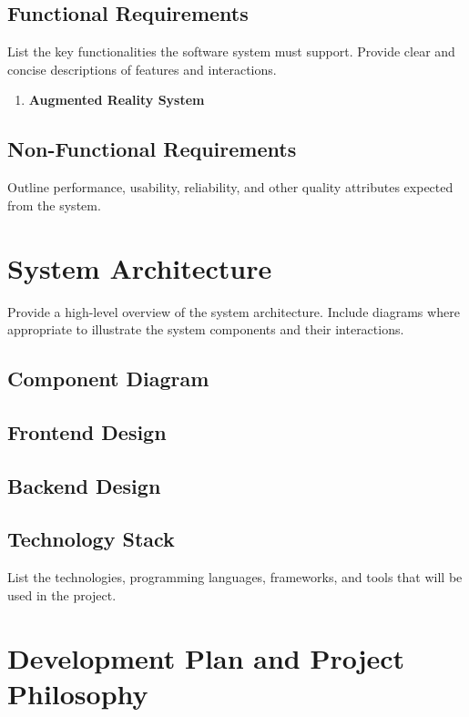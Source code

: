 \documentclass[12pt]{article}
\begin{document}
    \subsection{Functional Requirements}
    List the key functionalities the software system must support. Provide clear and concise descriptions of features and interactions.

    \begin{enumerate}
        \item \textbf{Augmented Reality System}
    \end{enumerate}

    \subsection{Non-Functional Requirements}
    Outline performance, usability, reliability, and other quality attributes expected from the system.

\section{System Architecture}
Provide a high-level overview of the system architecture. Include diagrams where appropriate to illustrate the system components and their interactions.

    \subsection{Component Diagram}
    \begin{center}
    \end{center}

    \subsection{Frontend Design}

    \subsection{Backend Design}

    \subsection{Technology Stack}
    List the technologies, programming languages, frameworks, and tools that will be used in the project.

\section{Development Plan and Project Philosophy}
\end{document}
